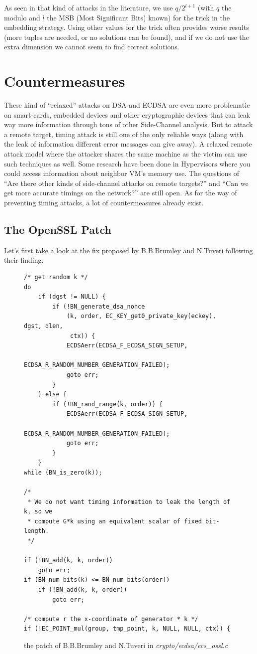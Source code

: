 \documentclass[a4paper,11pt]{article}
\begin{document}
As seen in that kind of attacks in the literature, we use $q / 2^{l + 1}$ (with $q$ the modulo and $l$ the MSB (Most Significant Bits) known) for the trick in the embedding strategy. Using other values for the trick often provides worse results (more tuples are needed, or no solutions can be found), and if we do not use the extra dimension we cannot seem to find correct solutions.

\section{Countermeasures}

These kind of ``relaxed'' attacks on DSA and ECDSA are even more problematic on smart-cards, embedded devices and other cryptographic devices that can leak way more information through tons of other Side-Channel analysis. But to attack a remote target, timing attack is still one of the only reliable ways (along with the leak of information different error messages can give away). A relaxed remote attack model where the attacker shares the same machine as the victim can use such techniques as well. Some research have been done in Hypervisors where you could access information about neighbor VM's memory use\cite{flushreload}\cite{flushreloadecdsa}\cite{flushreloadopenssl}. The questions of ``Are there other kinds of side-channel attacks on remote targets?'' and ``Can we get more accurate timings on the network?'' are still open. As for the way of preventing timing attacks, a lot of countermeasures already exist.

\subsection{The OpenSSL Patch}

Let's first take a look at the fix proposed by B.B.Brumley and N.Tuveri following their finding.

\begin{figure}[H]
\begin{verbatim}
/* get random k */
do
    if (dgst != NULL) {
        if (!BN_generate_dsa_nonce
            (k, order, EC_KEY_get0_private_key(eckey), dgst, dlen,
             ctx)) {
            ECDSAerr(ECDSA_F_ECDSA_SIGN_SETUP,
                     ECDSA_R_RANDOM_NUMBER_GENERATION_FAILED);
            goto err;
        }
    } else {
        if (!BN_rand_range(k, order)) {
            ECDSAerr(ECDSA_F_ECDSA_SIGN_SETUP,
                     ECDSA_R_RANDOM_NUMBER_GENERATION_FAILED);
            goto err;
        }
    }
while (BN_is_zero(k));

/*
 * We do not want timing information to leak the length of k, so we
 * compute G*k using an equivalent scalar of fixed bit-length.
 */

if (!BN_add(k, k, order))
    goto err;
if (BN_num_bits(k) <= BN_num_bits(order))
    if (!BN_add(k, k, order))
        goto err;

/* compute r the x-coordinate of generator * k */
if (!EC_POINT_mul(group, tmp_point, k, NULL, NULL, ctx)) {
\end{verbatim}
\caption{the patch of B.B.Brumley and N.Tuveri in \textit{crypto/ecdsa/ecs\_ossl.c}}
\end{figure}
\end{document}
